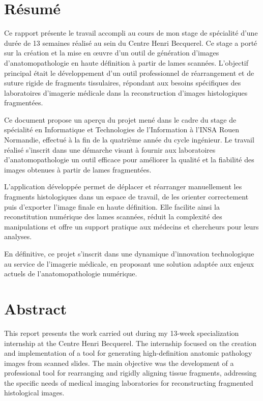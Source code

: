 \documentclass[11pt,a4paper]{report}
\begin{document}
\newpage
\thispagestyle{empty}

\vspace*{2cm}

\section*{Résumé}

Ce rapport présente le travail accompli au cours de mon stage de spécialité d'une durée de 13 semaines réalisé au sein du Centre Henri Becquerel. Ce stage a porté sur la création et la mise en œuvre d'un outil de génération d'images d'anatomopathologie en haute définition à partir de lames scannées. L'objectif principal était le développement d'un outil professionnel de réarrangement et de suture rigide de fragments tissulaires, répondant aux besoins spécifiques des laboratoires d'imagerie médicale dans la reconstruction d'images histologiques fragmentées.

Ce document propose un aperçu du projet mené dans le cadre du stage de spécialité en Informatique et Technologies de l'Information à l'INSA Rouen Normandie, effectué à la fin de la quatrième année du cycle ingénieur. Le travail réalisé s'inscrit dans une démarche visant à fournir aux laboratoires d'anatomopathologie un outil efficace pour améliorer la qualité et la fiabilité des images obtenues à partir de lames fragmentées.

L'application développée permet de déplacer et réarranger manuellement les fragments histologiques dans un espace de travail, de les orienter correctement puis d'exporter l'image finale en haute définition. Elle facilite ainsi la reconstitution numérique des lames scannées, réduit la complexité des manipulations et offre un support pratique aux médecins et chercheurs pour leurs analyses.

En définitive, ce projet s'inscrit dans une dynamique d'innovation technologique au service de l'imagerie médicale, en proposant une solution adaptée aux enjeux actuels de l'anatomopathologie numérique.

\vspace{1cm}

\section*{Abstract}

This report presents the work carried out during my 13-week specialization internship at the Centre Henri Becquerel. The internship focused on the creation and implementation of a tool for generating high-definition anatomic pathology images from scanned slides. The main objective was the development of a professional tool for rearranging and rigidly aligning tissue fragments, addressing the specific needs of medical imaging laboratories for reconstructing fragmented histological images.
\end{document}
